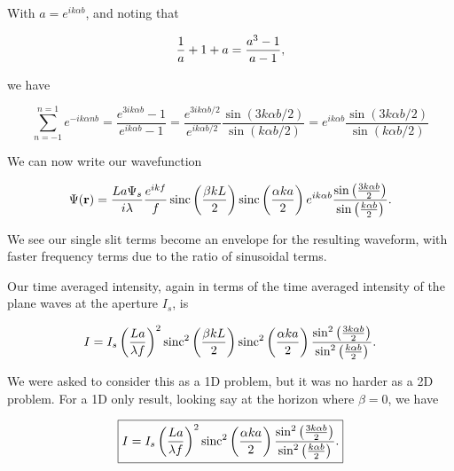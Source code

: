{With $a = e^{i k \alpha b}$, and noting that

\begin{equation}\label{eqn:modernOptics:ProblemSet2:P1:310}
\frac{1}{a} + 1 + a = \frac{a^3 - 1}{a - 1},
\end{equation}

we have

\begin{dmath}\label{eqn:modernOptics:ProblemSet2:P1:330}
\sum_{n=-1}^{n=1}
e^{-i k \alpha n b}
=
\frac{ e^{3 i k \alpha b} - 1 }{ e^{i k \alpha b} - 1 }
=
\frac{ e^{3 i k \alpha b/2} }{ e^{i k \alpha b/2} }
\frac{ \sin( 3 k \alpha b/2 ) }{ \sin( k \alpha b/2 ) }
=
e^{i k \alpha b} 
\frac{ \sin( 3 k \alpha b/2 ) }{ \sin( k \alpha b/2 ) }
\end{dmath}

We can now write our wavefunction

\begin{equation}\label{eqn:modernOptics:ProblemSet2:P1:350}
\Psi(\mathbf{r}) = \frac{L a \Psi_s}{i \lambda} \frac{e^{i k f}}{f} 
\operatorname{sinc}\left( \frac{\beta k L}{2} \right)
\operatorname{sinc}\left( \frac{\alpha k a}{2} \right)
e^{i k \alpha b} 
\frac{ \sin \left( \frac{3 k \alpha b}{2} \right) }{ \sin\left( \frac{k \alpha b}{2} \right) }.
\end{equation}

We see our single slit terms become an envelope for the resulting waveform, with faster frequency terms due to the ratio of sinusoidal terms.

Our time averaged intensity, again in terms of the time averaged intensity of the plane waves at the aperture $I_s$, is

\begin{equation}\label{eqn:modernOptics:ProblemSet2:P1:370}
I = I_s \left( \frac{L a}{\lambda f} \right)^2
\operatorname{sinc}^2\left( \frac{\beta k L}{2} \right)
\operatorname{sinc}^2\left( \frac{\alpha k a}{2} \right)
\frac{ \sin^2 \left( \frac{3 k \alpha b}{2} \right) }{ \sin^2\left( \frac{k \alpha b}{2} \right) }.
\end{equation}

We were asked to consider this as a 1D problem, but it was no harder as a 2D problem.  For a 1D only result, looking say at the horizon where $\beta = 0$, we have

\begin{equation}\label{eqn:modernOptics:ProblemSet2:P1:390}
\boxed{
I = I_s \left( \frac{L a}{\lambda f} \right)^2
\operatorname{sinc}^2\left( \frac{\alpha k a}{2} \right)
\frac{ \sin^2 \left( \frac{3 k \alpha b}{2} \right) }{ \sin^2\left( \frac{k \alpha b}{2} \right) }.
}
\end{equation}

}
